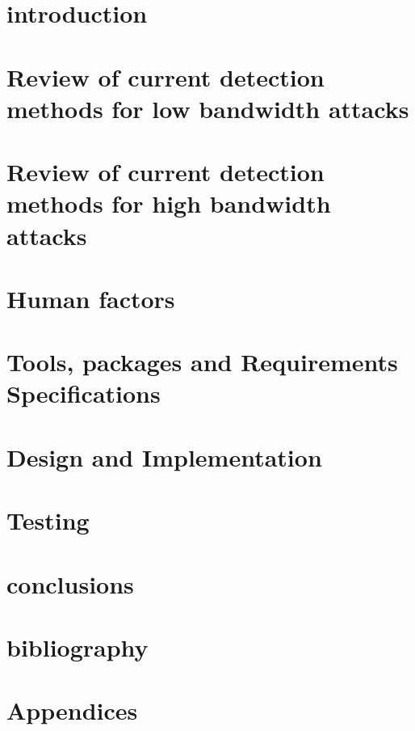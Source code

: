 \documentclass[11pt,twoside]{book}
\begin{document}
\frontmatter
%
%
%
%
\tableofcontents

\mainmatter
\chapter{introduction}

\chapter{Review of current detection methods for low bandwidth attacks}

\chapter{Review of current detection methods for high bandwidth attacks}
 
\chapter{Human factors}\label{Human factors}

\chapter{Tools, packages and Requirements Specifications}

\chapter{Design and Implementation}

\chapter{Testing}

\chapter{conclusions}

\chapter{bibliography}
\printbibliography
\chapter{Appendices}
\appendix
%
\end{document}
